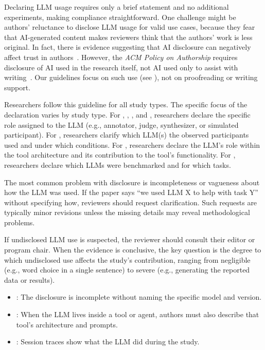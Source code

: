 
Declaring LLM usage requires only a brief statement and no additional experiments, making compliance straightforward.
One challenge might be authors' reluctance to disclose LLM usage for valid use cases, because they fear that AI-generated content makes reviewers think that the authors' work is less original.
In fact, there is evidence suggesting that AI disclosure can negatively affect trust in authors~\cite{SCHILKE2025104405}.
However, the \emph{ACM Policy on Authorship} requires disclosure of AI used in the research itself, not AI used only to assist with writing~\cite{ACM2026}.
Our guidelines focus on such use (see \scope), not on proofreading or writing support.


Researchers \must follow this guideline for all study types.
The specific focus of the declaration varies by study type.
For \annotators, \judges, \synthesis, and \subjects, researchers \must declare the specific role assigned to the LLM (e.g., annotator, judge, synthesizer, or simulated participant).
For \llmusage, researchers \must clarify which LLM(s) the observed participants used and under which conditions.
For \newtools, researchers \must declare the LLM's role within the tool architecture and its contribution to the tool's functionality.
For \benchmarkingtasks, researchers \must declare which LLMs were benchmarked and for which tasks.


The most common problem with disclosure is incompleteness or vagueness about how the LLM was used. If the paper says ``we used LLM X to help with task Y'' without specifying how, reviewers should request clarification. Such requests are typically minor revisions unless the missing details may reveal methodological problems.

If undisclosed LLM use is suspected, the reviewer should consult their editor or program chair. When the evidence is conclusive, the key question is the degree to which undisclosed use affects the study's contribution, ranging from negligible (e.g., word choice in a single sentence) to severe (e.g., generating the reported data or results).

\begin{itemize}[label=$\rightarrow$]
    \item \seemodelversion: The disclosure is incomplete without naming the specific model and version.
    \item \seedesign: When the LLM lives inside a tool or agent, authors must also describe that tool's architecture and prompts.
    \item \seetraces: Session traces show what the LLM did during the study.
\end{itemize}